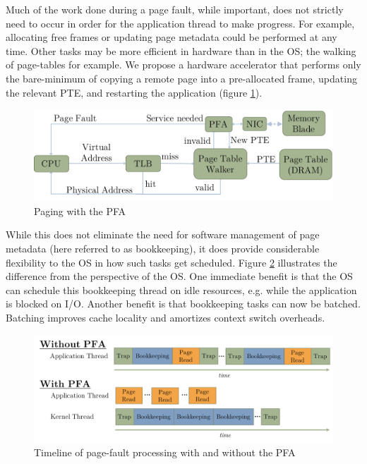 Much of the work done during a page fault, while important, does not strictly
need to occur in order for the application thread to make progress. For
example, allocating free frames or updating page metadata could be performed at
any time. Other tasks may be more efficient in hardware than in the OS; the
walking of page-tables for example. We propose a hardware accelerator that
performs only the bare-minimum of copying a remote page into a pre-allocated
frame, updating the relevant PTE, and restarting the application (figure
\ref{fig:pfa_generic}).

\begin{figure}[h]
    \centering
    \includegraphics[width=0.9\columnwidth]{figs/generic_pfa.pdf}
    \vspace{-5mm}
    \caption{Paging with the PFA}
    \label{fig:pfa_generic}
\end{figure}

While this does not eliminate the need for software management of page metadata
(here referred to as \gls{bookkeeping}), it does provide considerable flexibility
to the OS in how such \glspl{task} get scheduled. Figure
\ref{fig:bookkeeping_timeline} illustrates the difference from the perspective
of the OS. One immediate benefit is that the OS can schedule this bookkeeping
thread on idle resources, e.g. while the application is blocked on I/O.
Another benefit is that bookkeeping tasks can now be batched. Batching improves
cache locality and amortizes context switch overheads. 

\begin{figure}[h]
    \centering
    \includegraphics[width=\columnwidth]{figs/bookkeeping_timeline.pdf}
    \vspace{-5mm}
    \caption{Timeline of page-fault processing with and without the PFA}
    \label{fig:bookkeeping_timeline}
\end{figure}

